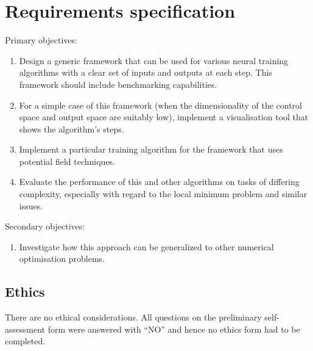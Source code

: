 \chapter{Requirements specification}
Primary objectives:
\begin{enumerate}
    \item Design a generic framework that can be used for various neural training algorithms
    with a clear set of inputs and outputs at each step. This framework should include
    benchmarking capabilities.
    \item For a simple case of this framework (when the dimensionality of the control space
    and output space are suitably low), implement a visualisation tool that shows the
    algorithm’s steps.
    \item Implement a particular training algorithm for the framework that uses potential field
    techniques.
    \item Evaluate the performance of this and other algorithms on tasks of differing
    complexity, especially with regard to the local minimum problem and similar issues.
\end{enumerate}
Secondary objectives:
\begin{enumerate}
    \item Investigate how this approach can be generalized to other numerical optimisation problems.
\end{enumerate}

\section{Ethics}
There are no ethical considerations. 
All questions on the preliminary self-assessment form were answered with ``NO'' and hence no ethics form had to be completed.
